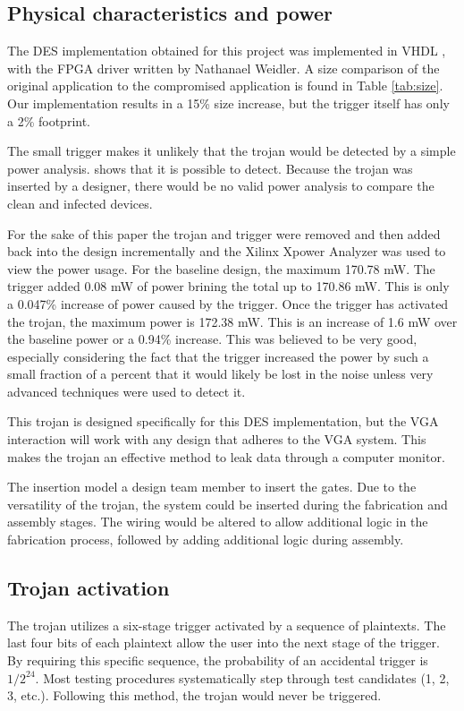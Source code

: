 	\subsection{Physical characteristics and power}
	The DES implementation obtained for this project was implemented in VHDL \cite{McQueen2003}, with the FPGA driver written by Nathanael Weidler. A size comparison of the original application to the compromised application is found in Table \ref{tab:size}. Our implementation results in a 15\% size increase, but the trigger itself has only a 2\% footprint.

	The small trigger makes it unlikely that the trojan would be detected by a simple power analysis. \cite{jha2008randomization} shows that it is possible to detect. Because the trojan was inserted by a designer, there would be no valid power analysis to compare the clean and infected devices. 
	
	For the sake of this paper the trojan and trigger were removed and then added back into the design incrementally and the Xilinx Xpower Analyzer was used to view the power usage.  For the baseline design, the maximum 170.78 mW.  The trigger added 0.08 mW of power brining the total up to 170.86 mW.  This is only a 0.047\% increase of power caused by the trigger.  Once the trigger has activated the trojan, the maximum power is 172.38 mW.  This is an increase of 1.6 mW over the baseline power or a 0.94\% increase.  This was believed to be very good, especially considering the fact that the trigger increased the power by such a small fraction of a percent that it would likely be lost in the noise unless very advanced techniques were used to detect it.

	

	This trojan is designed specifically for this DES implementation, but the VGA interaction will work with any design that adheres to the VGA system. This makes the trojan an effective method to leak data through a computer monitor. 

	The insertion model a design team member to insert the gates.  Due to the versatility of the trojan, the system could be inserted during the fabrication and assembly stages. The wiring would be altered to allow additional logic in the fabrication process, followed by adding additional logic during assembly. 

	\subsection{Trojan activation}
	The trojan utilizes a six-stage trigger activated by a sequence of plaintexts. The last four bits of each plaintext allow the user into the next stage of the trigger. By requiring this specific sequence, the probability of an accidental trigger is $1/2^{24}$. Most testing procedures systematically step through test candidates (1, 2, 3, etc.). Following this method, the trojan would never be triggered. 

